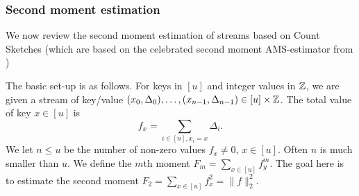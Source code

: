 \subsubsection{Second moment estimation}\label{sec:count-sketch}
We now review the second moment estimation of streams based on Count Sketches \cite{charikar04count-sketch} (which are based on the
celebrated second moment AMS-estimator from \cite{alon96frequency})

The basic set-up is as follows.  For keys in $[u]$ and integer values in $\mathbb Z$, we are given a stream of key/value $(x_0,\Delta_0),\ldots, (x_{n-1},\Delta_{n-1})\in [u]\times\mathbb Z$. The
total value of key $x\in[u]$ is
\[f_x=\sum_{i\in[n],x_i=x} \Delta_i.\]
We let $n\leq u$ be  the number of non-zero values
$f_x\neq 0$, $x\in [u]$. Often $n$ is much smaller than $u$.
We define the $m$th moment $F_m = \sum_{x\in [u]}f_y^m$. The goal here is to
estimate the second moment $F_2 = \sum_{x\in [u]}f_x^2=\|f\|^2_2$. 

